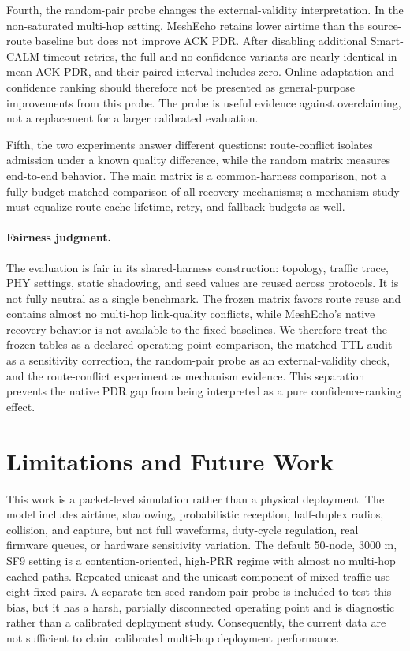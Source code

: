 \documentclass[conference]{IEEEtran}
\begin{document}
Fourth, the random-pair probe changes the external-validity interpretation. In
the non-saturated multi-hop setting, MeshEcho retains lower airtime than the
source-route baseline but does not improve ACK PDR. After disabling additional
Smart-CALM timeout retries, the full and no-confidence variants are nearly
identical in mean ACK PDR, and their paired interval includes zero. Online
adaptation and confidence ranking should therefore not be presented as
general-purpose improvements from this probe. The probe is useful evidence
against overclaiming, not a replacement for a larger calibrated evaluation.

Fifth, the two experiments answer different questions: route-conflict isolates
admission under a known quality difference, while the random matrix measures
end-to-end behavior. The main matrix is a common-harness comparison, not a
fully budget-matched comparison of all recovery mechanisms; a mechanism study
must equalize route-cache lifetime, retry, and fallback budgets as well.

\paragraph{Fairness judgment.}
The evaluation is fair in its shared-harness construction: topology, traffic
trace, PHY settings, static shadowing, and seed values are reused across
protocols. It is not fully neutral as a single benchmark. The frozen matrix
favors route reuse and contains almost no multi-hop link-quality conflicts,
while MeshEcho's native recovery behavior is not available to the fixed
baselines. We therefore treat the frozen tables as a declared operating-point
comparison, the matched-TTL audit as a sensitivity correction, the random-pair
probe as an external-validity check, and the route-conflict experiment as
mechanism evidence. This separation prevents the native PDR gap from being
interpreted as a pure confidence-ranking effect.

\section{Limitations and Future Work}

This work is a packet-level simulation rather than a physical deployment. The
model includes airtime, shadowing, probabilistic reception, half-duplex radios,
collision, and capture, but not full waveforms, duty-cycle regulation, real
firmware queues, or hardware sensitivity variation. The default 50-node,
3000 m, SF9 setting is a contention-oriented, high-PRR regime with almost no
multi-hop cached paths. Repeated unicast and the unicast component of mixed
traffic use eight fixed pairs. A separate ten-seed random-pair probe is included
to test this bias, but it has a harsh, partially disconnected operating point
and is diagnostic rather than a calibrated deployment study. Consequently,
the current data are not sufficient to claim calibrated multi-hop deployment
performance.
\end{document}
